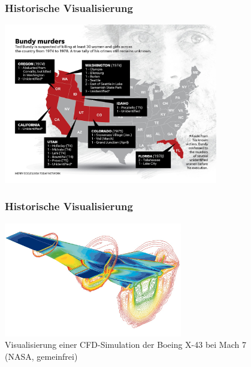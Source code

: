 \begin{frame}
\frametitle{Historische Visualisierung}

\vfill
\begin{center}
	\includegraphics[height=70mm]{fig5/historical-tedbundy.jpg}
\end{center}
\vfill
\end{frame}


\begin{frame}
\frametitle{Historische Visualisierung}

\vfill
\begin{center}
	\includegraphics[height=50mm]{fig5/historical-nasa.jpg} \\
	\scriptsize Visualisierung einer CFD-Simulation der Boeing X-43 bei Mach 7 \\
	\tiny (NASA, gemeinfrei)
\end{center}
\vfill
\end{frame}


%


